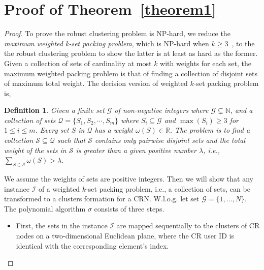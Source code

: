 \documentclass[times]{ettauth}
\newcommand{\ie}{i.e., }
\theoremstyle{mytheoremstyle}
\theoremstyle{mytheoremstyle}
\theoremstyle{mytheoremstyle}
\newtheorem{mydef}{Definition}
\begin{document}
\section{Proof of Theorem~\ref{theorem1}}
\label{proof_theorem1}
\begin{proof}
To prove the robust clustering problem is NP-hard, we reduce the \textit{maximum weighted k-set packing problem}, which is NP-hard when $k\geqslant 3$~\cite{Computers_a_Intractability}, to the the robust clustering problem to show the latter is at least as hard as the former.
Given a collection of sets of cardinality at most $k$ with weights for each set, the maximum weighted packing problem is that of finding a collection of disjoint sets of maximum total weight.
The decision version of weighted $k$-set packing problem is,
\begin{mydef}
\label{def_kset_packing}
Given a finite set $\mathcal{G}$ of non-negative integers where $\mathcal{G} \subsetneq \mathbb{N}$, and a collection of sets $\mathcal{Q}=\{S_1,S_2,\cdots,S_m\}$ where $S_i \subseteq \mathcal{G}$ and $\max(S_i)\geq 3$ for $1 \leq i \leq m$.
Every set $S$ in $\mathcal{Q}$ has a weight $\omega(S) \in \mathbb{R}$. 
%
The problem is to find a collection $\mathcal{S} \subseteq \mathcal{Q}$ such that $\mathcal{S}$ contains only pairwise disjoint sets and the total weight of the sets in $\mathcal{S}$ is greater than a given positive number $\lambda$, i.e., $\sum_{S \in \mathcal{S}} \omega(S) > \lambda$.
\end{mydef}

We assume the weights of sets are positive integers.
Then we will show that any instance $\mathcal{I}$ of a weighted $k$-set packing problem, \ie a collection of sets, can be transformed to a clusters formation for a CRN.
W.l.o.g. let set $\mathcal{G} = \{ 1, \ldots , N \}$.
The polynomial algorithm $\sigma$ consists of three steps.

\begin{itemize}


\item First, the sets in the instance $\mathcal{I}$ are mapped sequentially to the clusters of CR nodes on a two-dimensional Euclidean plane, where the CR user ID is identical with the corresponding element's index.


\end{itemize}
\end{proof}
\end{document}
